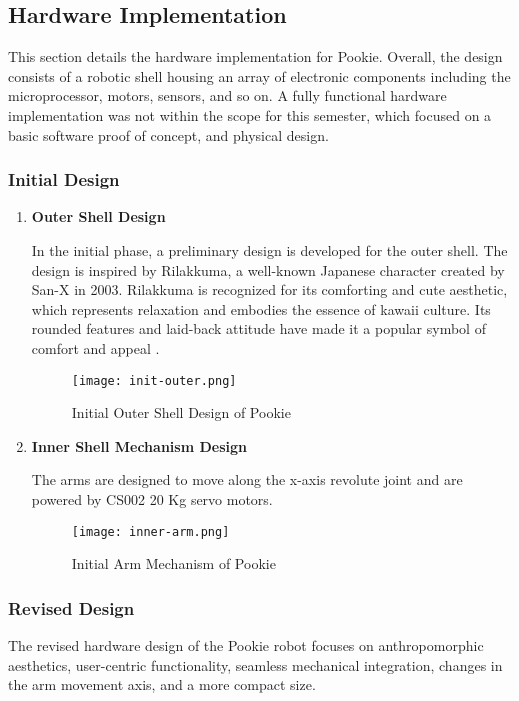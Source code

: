 \subsection{Hardware Implementation}
This section details the hardware implementation for Pookie. Overall, the design consists of a robotic shell housing an array of electronic components including the microprocessor, motors, sensors, and so on. A fully functional hardware implementation was not within the scope for this semester, which focused on a basic software proof of concept, and physical design.


\subsubsection{Initial Design}
\begin{enumerate}

    \item\textbf{Outer Shell Design}
    
    In the initial phase, a preliminary design is developed for the outer shell. The design is inspired by Rilakkuma, a well-known Japanese character created by San-X in 2003. Rilakkuma is recognized for its comforting and cute aesthetic, which represents relaxation and embodies the essence of kawaii culture. Its rounded features and laid-back attitude have made it a popular symbol of comfort and appeal \cite{hinka_rilakkuma_history}.
    
    \begin{figure}[ht]
        \centering
        \texttt{[image: init-outer.png]}
        \caption{Initial Outer Shell Design of Pookie}
        \label{fig:init-outer}
    \end{figure}

    \item\textbf{Inner Shell Mechanism Design}

    The arms are designed to move along the x-axis revolute joint and are powered by CS002 20 Kg servo motors.
    \begin{figure}[ht]
        \centering
        \texttt{[image: inner-arm.png]}
        \caption{Initial Arm Mechanism of Pookie}
        \label{fig:inner-arm}
    \end{figure}
    
\end{enumerate}
\newpage
\subsubsection{Revised Design}
The revised hardware design of the Pookie robot focuses on anthropomorphic aesthetics, user-centric functionality, seamless mechanical integration, changes in the arm movement axis, and a more compact size.

